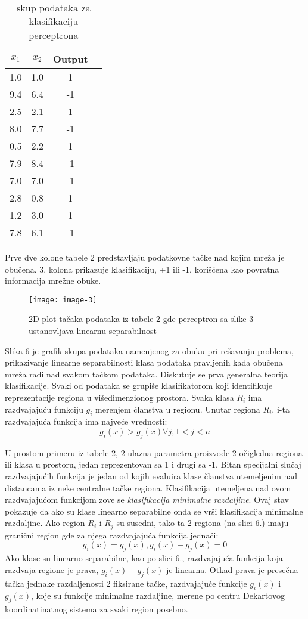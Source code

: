 \documentclass[fontsize=11bp, paper=a4]{scrarticle}
\begin{document}
\begin{table}[h!]
    \centering
    \begin{tabular}{|c|c|c|c|}
    \hline    
    $x_1$ & $x_2$ & Output \\ \hline
    1.0& 1.0 &  1 \\ \hline
    9.4& 6.4 &  -1 \\ \hline
    2.5& 2.1 &  1 \\ \hline
    8.0& 7.7 &  -1 \\ \hline
    0.5& 2.2 &  1 \\ \hline
    7.9& 8.4 &  -1 \\ \hline
    7.0& 7.0 &  -1 \\ \hline
    2.8& 0.8 &  1 \\ \hline
    1.2& 3.0 &  1 \\ \hline
    7.8& 6.1 &  -1 \\ \hline
    \end{tabular}
    \caption{ skup podataka za klasifikaciju perceptrona }
\end{table}
Prve dve kolone tabele 2 predstavljaju podatkovne tačke nad kojim mreža je obučena. 3. kolona prikazuje klasifikaciju, +1 ili -1, korišćena kao povratna informacija mrežne obuke. 
\begin{figure}[h]
    \centering
    \texttt{[image: image-3]}
    \caption{2D plot tačaka podataka iz tabele 2 gde perceptron sa slike 3 ustanovljava linearnu separabilnost}
\end{figure}

Slika 6 je grafik skupa podataka namenjenog za obuku pri rešavanju problema, prikazivanje linearne separabilnosti klasa podataka pravljenih kada obučena mreža radi nad svakom tačkom podataka. Diskutuje se prva generalna teorija klasifikacije. Svaki od podataka se grupiše klasifikatorom koji identifikuje reprezentacije regiona u višedimenzionog prostora. Svaka klasa $R_i$ ima razdvajajuću funkciju $g_i$ merenjem članstva u regionu. Unutar regiona $R_i$, i-ta razdvajajuća funkcija ima najveće vrednosti:
$$
g_i(x) > g_j(x) \forall j, 1 < j < n
$$

U prostom primeru iz tabele 2, 2 ulazna parametra proizvode 2 očigledna regiona ili klasa u prostoru, jedan reprezentovan sa 1 i drugi sa -1. Bitan specijalni slučaj razdvajajućih funkcija je jedan od kojih evaluira klase članstva utemeljenim nad distancama iz neke centralne tačke regiona. Klasifikacija utemeljena nad ovom razdvajajućom funkcijom zove se \textit{klasifikacija minimalne razdaljine}. Ovaj stav pokazuje da ako su klase linearno separabilne onda se vrši klasifikacija minimalne razdaljine. Ako region $R_i$ i $R_j$ su susedni, tako ta 2 regiona (na slici 6.) imaju granični region gde za njega razdvajajuća funkcija jednači:
$$
g_i(x) = g_j(x), g_i(x) - g_j(x) = 0
$$
Ako klase su linearno separabilne, kao po slici 6., razdvajajuća funkcija koja razdvaja regione je prava, $g_i(x) - g_j (x)$ je linearna. Otkad prava je presečna tačka jednake razdaljenosti 2 fiksirane tačke, razdvajajuće funkcije $g_i(x)$ i $g_j(x)$, koje su funkcije minimalne razdaljine, merene po centru Dekartovog koordinatinatnog sistema za svaki region posebno. 
\end{document}
